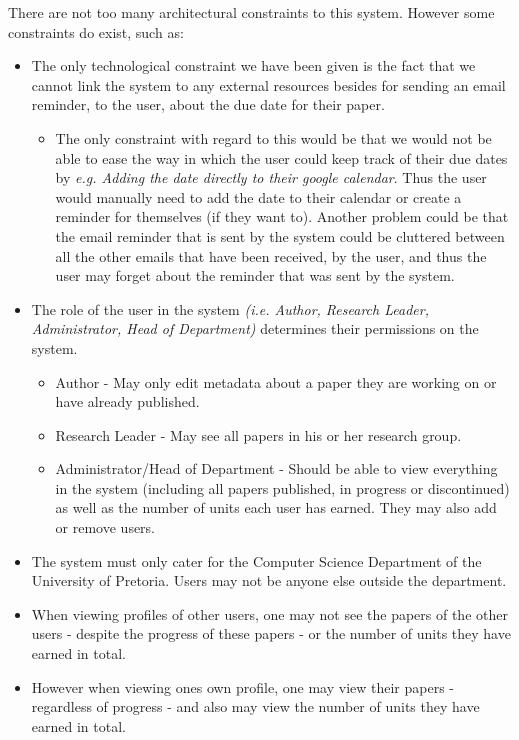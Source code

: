 \documentclass[a4paper,12pt]{article}
\begin{document}
There are not too many architectural constraints to this system. However some constraints do exist, such as:
\begin{itemize}
\item The only technological constraint we have been given is the fact that we cannot link the system to any external resources besides for sending an email reminder, to the user, about the due date for their paper.
	\begin{itemize}
	\item The only constraint with regard to this would be that we would not be able to ease the way in which the user could keep track of their due dates by \textit{e.g. Adding the date directly to their google calendar}. Thus the user would manually need to add the date to their calendar or create a reminder for themselves (if they want to). Another problem could be that the email reminder that is sent by the system could be cluttered between all the other emails that have been received, by the user, and thus the user may forget about the reminder that was sent by the system. 
	\end{itemize}
\item The role of the user in the system \textit{(i.e. Author, Research Leader, Administrator, Head of Department)} determines their permissions on the system.
	\begin{itemize}
	\item Author - May only edit metadata about a paper they are working on or have already published.
	\item Research Leader - May see all papers in his or her research group.
	\item Administrator/Head of Department - Should be able to view everything in the system (including all papers published, in progress or discontinued) as well as the number of units each user has earned. They may also add or remove users.
	\end{itemize}
\item The system must only cater for the Computer Science Department of the University of Pretoria. Users may not be anyone else outside the department. 
\item When viewing profiles of other users, one may not see the papers of the other users - despite the progress of these papers - or the number of units they have earned in total. 
\item However when viewing ones own profile, one may view their papers - regardless of progress - and also may view the number of units they have earned in total. 

\end{itemize}
\end{document}
